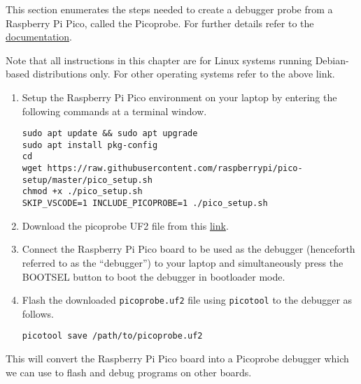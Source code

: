 This section enumerates the steps needed to create a debugger probe from a
Raspberry Pi Pico, called the Picoprobe. For further details refer to the
\href{https://www.raspberrypi.com/documentation/microcontrollers/raspberry-pi-pico.html#debugging-using-another-raspberry-pi-pico}{documentation}.

Note that all instructions in this chapter are for Linux systems running
Debian-based distributions only. For other operating systems refer to the above
link.

\begin{enumerate}
    \item Setup the Raspberry Pi Pico environment on your laptop by entering the
    following commands at a terminal window.

    \begin{lstlisting}
sudo apt update && sudo apt upgrade
sudo apt install pkg-config
cd
wget https://raw.githubusercontent.com/raspberrypi/pico-setup/master/pico_setup.sh
chmod +x ./pico_setup.sh
SKIP_VSCODE=1 INCLUDE_PICOPROBE=1 ./pico_setup.sh
    \end{lstlisting}

    \item Download the picoprobe UF2 file from this 
    \href{https://www.raspberrypi.com/documentation/microcontrollers/raspberry-pi-pico.html#debugging-using-another-raspberry-pi-pico}{link}.
    \item Connect the Raspberry Pi Pico board to be used as the debugger
    (henceforth referred to as the ``debugger'') to your laptop and
    simultaneously press the BOOTSEL button to boot the debugger in bootloader
    mode.
    \item Flash the downloaded \texttt{picoprobe.uf2} file using
    \texttt{picotool} to the debugger as follows.
    \begin{lstlisting}
picotool save /path/to/picoprobe.uf2
    \end{lstlisting}
\end{enumerate}

This will convert the Raspberry Pi Pico board into a Picoprobe debugger which we
can use to flash and debug programs on other boards.